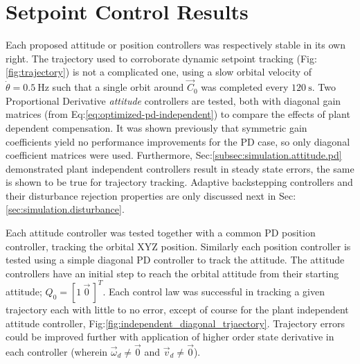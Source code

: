 \section{Setpoint Control Results}
\label{sec:simulation.autopilot}
Each proposed attitude or position controllers was respectively stable in its own right. The trajectory used to corroborate dynamic setpoint tracking (Fig:\ref{fig:trajectory}) is not a complicated one, using a slow orbital velocity of $\dot{\theta}=0.5~\text{Hz}$ such that a single orbit around $\vec{C}_0$ was completed every $120~\text{s}$. Two Proportional Derivative \emph{attitude} controllers are tested, both with diagonal gain matrices (from Eq:\ref{eq:optimized-pd-independent}) to compare the effects of plant dependent compensation. It was shown previously that symmetric gain coefficients yield no performance improvements for the PD case, so only diagonal coefficient matrices were used. Furthermore, Sec:\ref{subsec:simulation.attitude.pd} demonstrated plant independent controllers result in steady state errors, the same is shown to be true for trajectory tracking. Adaptive backstepping controllers and their disturbance rejection properties are only discussed next in Sec:\ref{sec:simulation.disturbance}. 
\par
Each attitude controller was tested together with a common PD position controller, tracking the orbital XYZ position. Similarly each position controller is tested using a simple diagonal PD controller to track the attitude. The attitude controllers have an initial step to reach the orbital attitude from their starting attitude; $Q_0=[1~\vec{0}\hspace{2pt}]^T$. Each control law was successful in tracking a given trajectory each with little to no error, except of course for the plant independent attitude controller, Fig:\ref{fig:independent_diagonal_trjaectory}. Trajectory errors could be improved further with application of higher order state derivative in each controller (wherein $\vec{\omega}_d\not=\vec{0}$ and $\vec{v}_d\not=\vec{0}$).
